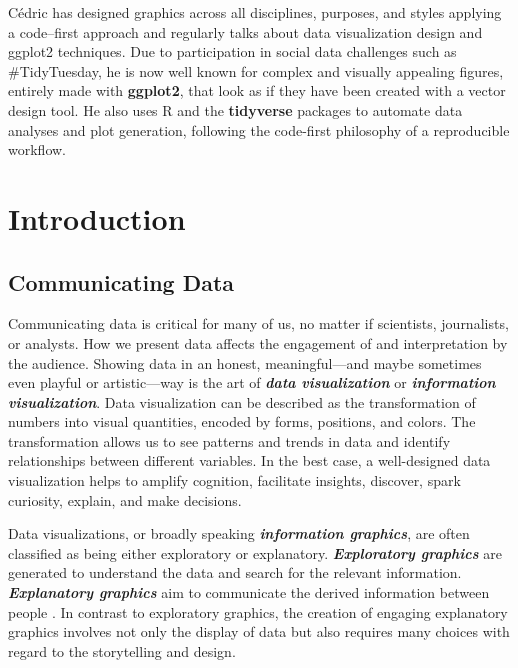 \documentclass[
]{krantz}
\begin{document}
Cédric has designed graphics across all disciplines, purposes, and styles applying a code--first approach and regularly talks about data visualization design and ggplot2 techniques. Due to participation in social data challenges such as \#TidyTuesday, he is now well known for complex and visually appealing figures, entirely made with \textbf{ggplot2}, that look as if they have been created with a vector design tool. He also uses R and the \textbf{tidyverse} packages to automate data analyses and plot generation, following the code-first philosophy of a reproducible workflow.

\mainmatter

\hypertarget{introduction}{%
\chapter{Introduction}\label{introduction}}

\hypertarget{communication}{%
\section{Communicating Data}\label{communication}}

Communicating data is critical for many of us, no matter if scientists, journalists, or analysts. How we present data affects the engagement of and interpretation by the audience. Showing data in an honest, meaningful---and maybe sometimes even playful or artistic---way is the art of \textbf{\emph{data visualization}} or \textbf{\emph{information visualization}}. Data visualization can be described as the transformation of numbers into visual quantities, encoded by forms, positions, and colors. The transformation allows us to see patterns and trends in data and identify relationships between different variables. In the best case, a well-designed data visualization helps to amplify cognition, facilitate insights, discover, spark curiosity, explain, and make decisions.

Data visualizations, or broadly speaking \textbf{\emph{information graphics}}, are often classified as being either exploratory or explanatory. \textbf{\emph{Exploratory graphics}} are generated to understand the data and search for the relevant information. \textbf{\emph{Explanatory graphics}} aim to communicate the derived information between people \citep{koponen&hilden2019}. In contrast to exploratory graphics, the creation of engaging explanatory graphics involves not only the display of data but also requires many choices with regard to the storytelling and design.
\end{document}
